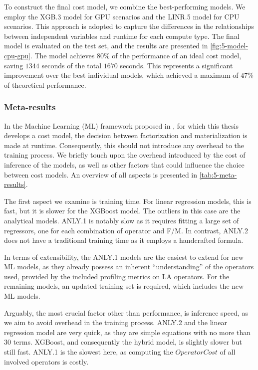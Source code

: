 To construct the final cost model, we combine the best-performing models. We employ the XGB.3 model for GPU scenarios and the LINR.5 model for CPU scenarios. This approach is adopted to capture the differences in the relationships between independent variables and runtime for each compute type. The final model is evaluated on the test set, and the results are presented in \autoref{fig:5-model-cpu-gpu}. The model achieves $80\%$ of the performance of an ideal cost model, saving $1344$ seconds of the total $1670$ seconds. This represents a significant improvement over the best individual models, which achieved a maximum of $47\%$ of theoretical performance.

\subsubsection{Meta-results}
In the Machine Learning (ML) framework proposed in \cite{amalur}, for which this thesis develops a cost model, the decision between factorization and materialization is made at runtime. Consequently, this should not introduce any overhead to the training process. We briefly touch upon the overhead introduced by the cost of inference of the models, as well as other factors that could influence the choice between cost models. An overview of all aspects is presented in \autoref{tab:5-meta-results}.

The first aspect we examine is training time. For linear regression models, this is fast, but it is slower for the XGBoost model. The outliers in this case are the analytical models. ANLY.1 is notably slow as it requires fitting a large set of regressors, one for each combination of operator and F/M. In contrast, ANLY.2 does not have a traditional training time as it employs a handcrafted formula.

In terms of extensibility, the ANLY.1 models are the easiest to extend for new ML models, as they already possess an inherent ``understanding'' of the operators used, provided by the included profiling metrics on LA operators. For the remaining models, an updated training set is required, which includes the new ML models.

Arguably, the most crucial factor other than performance, is inference speed, as we aim to avoid overhead in the training process. ANLY.2 and the linear regression model are very quick, as they are simple equations with no more than $30$ terms. XGBoost, and consequently the hybrid model, is slightly slower but still fast. ANLY.1 is the slowest here, as computing the $OperatorCost$ of all involved operators is costly.

